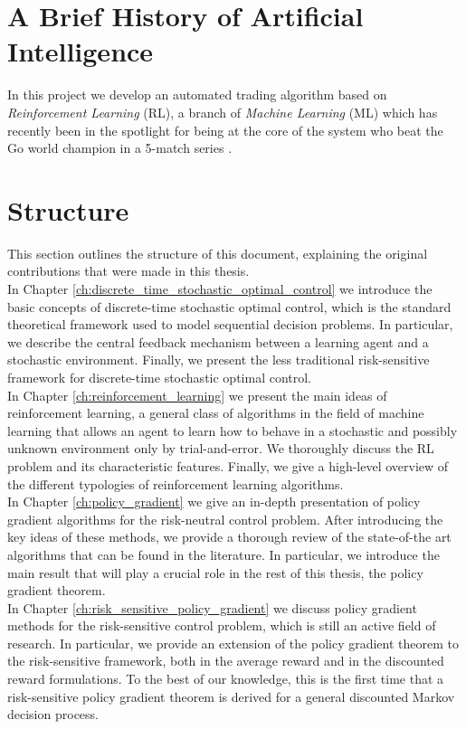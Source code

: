 \section{A Brief History of Artificial Intelligence}
In this project we develop an automated trading algorithm based on \emph{Reinforcement Learning} (RL), a branch of \emph{Machine Learning} (ML) which has recently been in the spotlight for being at the core of the system who beat the Go world champion in a 5-match series \cite{silver2016mastering}.

\section{Structure}
This section outlines the structure of this document, explaining the original contributions that were made in this thesis.\\
In Chapter \ref{ch:discrete_time_stochastic_optimal_control} we introduce the basic concepts of discrete-time stochastic optimal control, which is the standard theoretical framework used to model sequential decision problems. In particular, we describe the central feedback mechanism between a learning agent and a stochastic environment. Finally, we present the less traditional risk-sensitive framework for discrete-time stochastic optimal control.\\
In Chapter \ref{ch:reinforcement_learning} we present the main ideas of reinforcement learning, a general class of algorithms in the field of machine learning that allows an agent to learn how to behave in a stochastic and possibly unknown environment only by trial-and-error. We thoroughly discuss the RL problem and its characteristic features. Finally, we give a high-level overview of the different typologies of reinforcement learning algorithms.\\ 
In Chapter \ref{ch:policy_gradient} we give an in-depth presentation of policy gradient algorithms for the risk-neutral control problem. After introducing the key ideas of these methods, we provide a thorough review of the state-of-the art algorithms that can be found in the literature. In particular, we introduce the main result that will play a crucial role in the rest of this thesis, the policy gradient theorem.\\
In Chapter \ref{ch:risk_sensitive_policy_gradient} we discuss policy gradient methods for the risk-sensitive control problem, which is still an active field of research. In particular, we provide an extension of the policy gradient theorem to the risk-sensitive framework, both in the average reward and in the discounted reward formulations. To the best of our knowledge, this is the first time that a risk-sensitive policy gradient theorem is derived for a general discounted Markov decision process.\\
